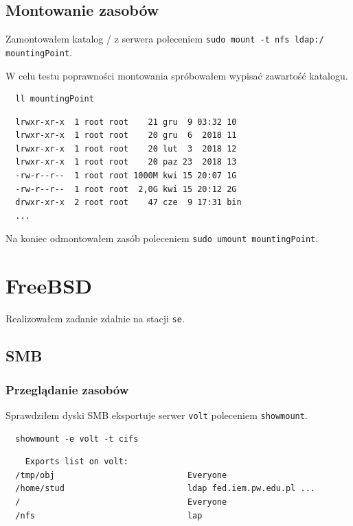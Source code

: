 \documentclass{article} %
\begin{document}
\subsection{Montowanie zasobów}
Zamontowałem katalog / z serwera poleceniem \texttt{sudo mount -t nfs ldap:/ mountingPoint}.

W celu testu poprawności montowania spróbowałem wypisać zawartość katalogu.
\begin{tcolorbox}[colback=yellow!10!white,colframe=red!45!black,coltitle=yellow!100!black, title=Ubuntu]
  \begin{lstlisting}
  ll mountingPoint
  \end{lstlisting}
  \tcblower
  \footnotesize
  \begin{lstlisting}
  lrwxr-xr-x  1 root root    21 gru  9 03:32 10
  lrwxr-xr-x  1 root root    20 gru  6  2018 11
  lrwxr-xr-x  1 root root    20 lut  3  2018 12
  lrwxr-xr-x  1 root root    20 paz 23  2018 13
  -rw-r--r--  1 root root 1000M kwi 15 20:07 1G 
  -rw-r--r--  1 root root  2,0G kwi 15 20:12 2G
  drwxr-xr-x  2 root root    47 cze  9 17:31 bin
  ...
  \end{lstlisting}
\end{tcolorbox}
\normalsize
\vspace{5mm}

Na koniec odmontowałem zasób poleceniem \texttt{sudo umount mountingPoint}.

\section{FreeBSD}
Realizowałem zadanie zdalnie na stacji \texttt{se}.

\subsection{SMB}

\subsubsection{Przeglądanie zasobów}
Sprawdziłem dyski SMB eksportuje serwer \texttt{volt} poleceniem \texttt{showmount}.

\begin{tcolorbox}[colback=yellow!10!white,colframe=red!45!black,coltitle=yellow!100!black, title=FreeBSD]
  \begin{lstlisting}
  showmount -e volt -t cifs
  \end{lstlisting}
  \tcblower
  \tiny
  \begin{lstlisting}
    Exports list on volt:
  /tmp/obj                           Everyone
  /home/stud                         ldap fed.iem.pw.edu.pl ...
  /                                  Everyone
  /nfs                               lap
  \end{lstlisting}
\end{tcolorbox}
\normalsize
\end{document}

